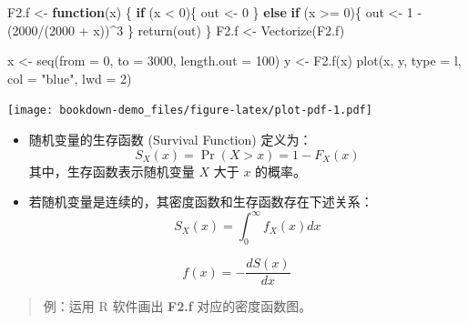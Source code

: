\documentclass[
]{book}
\newenvironment{Shaded}{\begin{snugshade}}{\end{snugshade}}
\newcommand{\AttributeTok}[1]{\textcolor[rgb]{0.77,0.63,0.00}{#1}}
\newcommand{\ControlFlowTok}[1]{\textcolor[rgb]{0.13,0.29,0.53}{\textbf{#1}}}
\newcommand{\DecValTok}[1]{\textcolor[rgb]{0.00,0.00,0.81}{#1}}
\newcommand{\FunctionTok}[1]{\textcolor[rgb]{0.00,0.00,0.00}{#1}}
\newcommand{\NormalTok}[1]{#1}
\newcommand{\OtherTok}[1]{\textcolor[rgb]{0.56,0.35,0.01}{#1}}
\newcommand{\SpecialCharTok}[1]{\textcolor[rgb]{0.00,0.00,0.00}{#1}}
\newcommand{\StringTok}[1]{\textcolor[rgb]{0.31,0.60,0.02}{#1}}
\begin{document}
\begin{Shaded}
\begin{Highlighting}[]
\NormalTok{F2.f }\OtherTok{\textless{}{-}} \ControlFlowTok{function}\NormalTok{(x) \{}
  \ControlFlowTok{if}\NormalTok{ (x }\SpecialCharTok{\textless{}} \DecValTok{0}\NormalTok{)\{}
\NormalTok{    out }\OtherTok{\textless{}{-}} \DecValTok{0}
\NormalTok{  \} }\ControlFlowTok{else} \ControlFlowTok{if}\NormalTok{ (x }\SpecialCharTok{\textgreater{}=} \DecValTok{0}\NormalTok{)\{}
\NormalTok{    out }\OtherTok{\textless{}{-}} \DecValTok{1} \SpecialCharTok{{-}}\NormalTok{ (}\DecValTok{2000}\SpecialCharTok{/}\NormalTok{(}\DecValTok{2000} \SpecialCharTok{+}\NormalTok{ x))}\SpecialCharTok{\^{}}\DecValTok{3}
\NormalTok{  \}}
  \FunctionTok{return}\NormalTok{(out)}
\NormalTok{\}}
\NormalTok{F2.f }\OtherTok{\textless{}{-}}  \FunctionTok{Vectorize}\NormalTok{(F2.f)}


\NormalTok{x }\OtherTok{\textless{}{-}} \FunctionTok{seq}\NormalTok{(}\AttributeTok{from =} \DecValTok{0}\NormalTok{, }\AttributeTok{to =} \DecValTok{3000}\NormalTok{, }\AttributeTok{length.out =} \DecValTok{100}\NormalTok{)}
\NormalTok{y }\OtherTok{\textless{}{-}} \FunctionTok{F2.f}\NormalTok{(x)}
\FunctionTok{plot}\NormalTok{(x, y, }\AttributeTok{type =} \StringTok{\textquotesingle{}l\textquotesingle{}}\NormalTok{, }\AttributeTok{col =} \StringTok{"blue"}\NormalTok{, }\AttributeTok{lwd =} \DecValTok{2}\NormalTok{)}
\end{Highlighting}
\end{Shaded}

\texttt{[image: bookdown-demo\_files/figure-latex/plot-pdf-1.pdf]}

\begin{itemize}
\item
  随机变量的生存函数 (Survival Function) 定义为：
  \[
  S_{X}(x)=\Pr(X>x)=1-F_{X}(x)
  \]
  其中，生存函数表示随机变量 \(X\) 大于 \(x\) 的概率。
\item
  若随机变量是连续的，其密度函数和生存函数存在下述关系： \[S_{X}(x)=\int_{0}^\infty f_{X}(x)dx\]
\end{itemize}

\[f(x)=-\frac{dS(x)}{dx}\]

\begin{quote}
例：运用 R 软件画出 \textbf{F2.f} 对应的密度函数图。
\end{quote}
\end{document}
